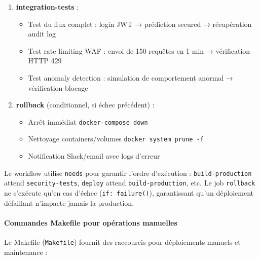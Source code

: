 \begin{enumerate}
\begin{itemize}
        \item Test prédiction baseline avec \texttt{sample\_safe.jpg} → vérification réponse contient "safe"
        \item Test prédiction secured avec \texttt{sample\_dangerous.jpg} → vérification réponse contient "dangerous"
        \item Test interface web accessible \texttt{http://localhost:8080}
        \item Test métriques Prometheus \texttt{http://localhost:9090/metrics}
    \end{itemize}
    \item \textbf{integration-tests} :
    \begin{itemize}
        \item Test du flux complet : login JWT → prédiction secured → récupération audit log
        \item Test rate limiting WAF : envoi de 150 requêtes en 1 min → vérification HTTP 429
        \item Test anomaly detection : simulation de comportement anormal → vérification blocage
    \end{itemize}
    \item \textbf{rollback} (conditionnel, si échec précédent) :
    \begin{itemize}
        \item Arrêt immédiat \texttt{docker-compose down}
        \item Nettoyage containers/volumes \texttt{docker system prune -f}
        \item Notification Slack/email avec logs d'erreur
    \end{itemize}
\end{enumerate}

Le workflow utilise \texttt{needs} pour garantir l'ordre d'exécution : \texttt{build-production} attend \texttt{security-tests}, \texttt{deploy} attend \texttt{build-production}, etc. Le job \texttt{rollback} ne s'exécute qu'en cas d'échec (\texttt{if: failure()}), garantissant qu'un déploiement défaillant n'impacte jamais la production.

\paragraph{Commandes Makefile pour opérations manuelles}

Le Makefile (\texttt{Makefile}) fournit des raccourcis pour déploiements manuels et maintenance :

